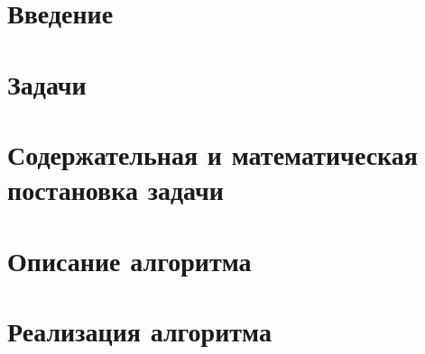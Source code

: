 \documentclass[12pt,a4paper]{article}
\begin{document}
\graphicspath{{img/}}



\clearpage
\setcounter{page}{2}

\section{Введение}



\section{Задачи}


\section{Содержательная и математическая постановка задачи}



\section{Описание алгоритма}


\section{Реализация алгоритма}

\end{document}
